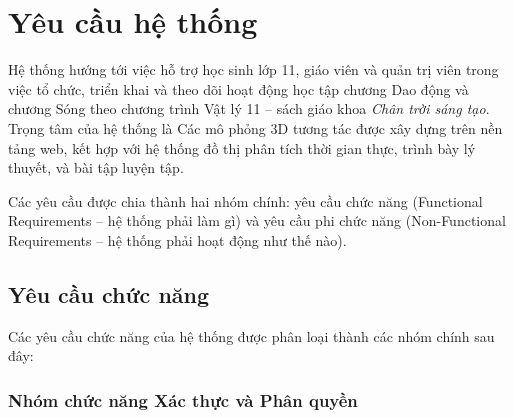 

\chapter{Yêu cầu hệ thống}

Hệ thống hướng tới việc hỗ trợ học sinh lớp 11, giáo viên và quản trị viên trong việc tổ chức, triển khai và theo dõi hoạt động học tập chương Dao động và chương Sóng theo chương trình Vật lý 11 – sách giáo khoa \textit{Chân trời sáng tạo}. Trọng tâm của hệ thống là Các mô phỏng 3D tương tác được xây dựng trên nền tảng web, kết hợp với hệ thống đồ thị phân tích thời gian thực, trình bày lý thuyết, và bài tập luyện tập.

Các yêu cầu được chia thành hai nhóm chính: yêu cầu chức năng (Functional Requirements – hệ thống phải làm gì) và yêu cầu phi chức năng (Non-Functional Requirements – hệ thống phải hoạt động như thế nào).

\section{Yêu cầu chức năng}

Các yêu cầu chức năng của hệ thống được phân loại thành các nhóm chính sau đây:

\subsection{Nhóm chức năng Xác thực và Phân quyền}

